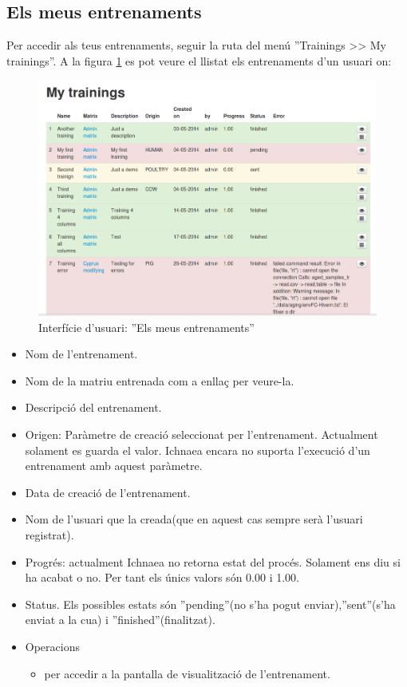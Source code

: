 \subsection{Els meus entrenaments}
\label{subsec:myTrainings}
Per accedir als teus entrenaments, seguir la ruta del menú ''Trainings >> My trainings''. A la figura \ref{fig:my_trainings} es pot veure el llistat els entrenaments d'un usuari on:
\begin{figure}[h!]
  \centering
  \includegraphics[scale=0.4]{img/userguide/my_trainings.png}
  \caption{Interfície d'usuari: ''Els meus entrenaments''}
  \label{fig:my_trainings}
\end{figure}

\begin{itemize}
\item Nom de l'entrenament.
\item Nom de la matriu entrenada com a enllaç per veure-la.
\item Descripci\'{o} del entrenament.
\item Origen: Paràmetre de creació seleccionat per l'entrenament. Actualment solament es guarda el valor. Ichnaea encara no suporta l'execució d'un entrenament amb aquest paràmetre.
\item Data de creaci\'{o} de l'entrenament.
\item Nom de l'usuari que la creada(que en aquest cas sempre serà l'usuari registrat).
\item Progr\'{e}s: actualment Ichnaea no retorna estat del proc\'{e}s. Solament ens diu si ha acabat o no. Per tant els \'{u}nics valors s\'{o}n 0.00 i 1.00.
\item Status. Els possibles estats s\'{o}n ''pending''(no s'ha pogut enviar),''sent''(s'ha enviat a la cua) i ''finished''(finalitzat). 
\item Operacions
 \begin{itemize}
 \item \iconeyeopen per accedir a la pantalla de visualització de l'entrenament.
 \end{itemize}
\end{itemize}



